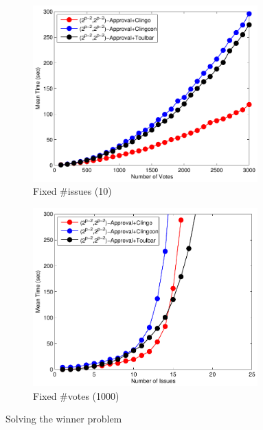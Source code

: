 {
	\begin{figure}
		\centering
    \begin{subfigure}[b]{0.45\textwidth}
			\centering
			\includegraphics[width=0.95\textwidth]{figs/LPTrees/win/2kAppFISCICP.pdf}
			\caption{Fixed \#issues (10)}
		\end{subfigure}
    \begin{subfigure}[b]{0.45\textwidth}
			\centering
			\includegraphics[width=0.95\textwidth]{figs/LPTrees/win/2kAppFVSCICP.pdf}
			\caption{Fixed \#votes (1000)}
		\end{subfigure}
		\caption{Solving the winner problem}
	\end{figure}
}

